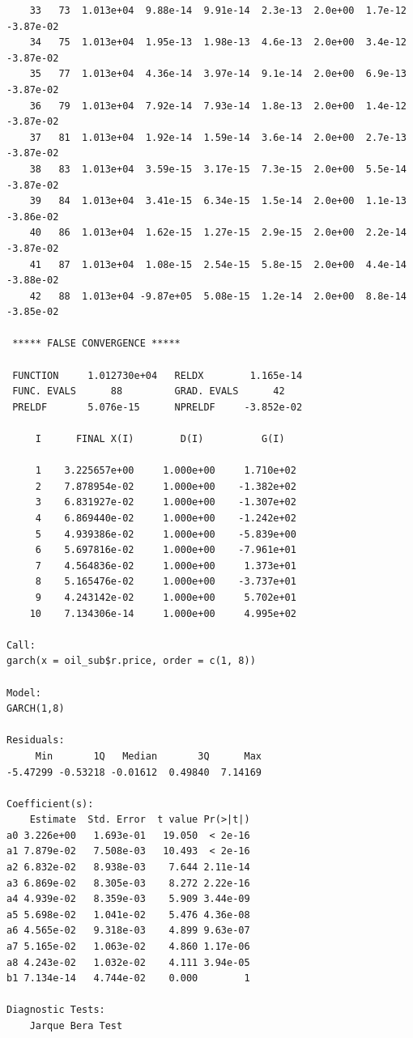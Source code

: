 \documentclass[11pt]{article}\usepackage[]{graphicx}\usepackage[]{color}
\makeatletter
\newenvironment{kframe}{%
 \def\at@end@of@kframe{}%
 \ifinner\ifhmode%
  \def\at@end@of@kframe{\end{minipage}}%
  \begin{minipage}{\columnwidth}%
 \fi\fi%
 \def\FrameCommand##1{\hskip\@totalleftmargin \hskip-\fboxsep
 \colorbox{shadecolor}{##1}\hskip-\fboxsep
     \hskip-\linewidth \hskip-\@totalleftmargin \hskip\columnwidth}%
 \MakeFramed {\advance\hsize-\width
   \@totalleftmargin\z@ \linewidth\hsize
   \@setminipage}}%
 {\par\unskip\endMakeFramed%
 \at@end@of@kframe}
\newenvironment{knitrout}{}{} %
\makeatother
\begin{document}
\begin{knitrout}
\begin{kframe}
\begin{verbatim}
    33   73  1.013e+04  9.88e-14  9.91e-14  2.3e-13  2.0e+00  1.7e-12 -3.87e-02
    34   75  1.013e+04  1.95e-13  1.98e-13  4.6e-13  2.0e+00  3.4e-12 -3.87e-02
    35   77  1.013e+04  4.36e-14  3.97e-14  9.1e-14  2.0e+00  6.9e-13 -3.87e-02
    36   79  1.013e+04  7.92e-14  7.93e-14  1.8e-13  2.0e+00  1.4e-12 -3.87e-02
    37   81  1.013e+04  1.92e-14  1.59e-14  3.6e-14  2.0e+00  2.7e-13 -3.87e-02
    38   83  1.013e+04  3.59e-15  3.17e-15  7.3e-15  2.0e+00  5.5e-14 -3.87e-02
    39   84  1.013e+04  3.41e-15  6.34e-15  1.5e-14  2.0e+00  1.1e-13 -3.86e-02
    40   86  1.013e+04  1.62e-15  1.27e-15  2.9e-15  2.0e+00  2.2e-14 -3.87e-02
    41   87  1.013e+04  1.08e-15  2.54e-15  5.8e-15  2.0e+00  4.4e-14 -3.88e-02
    42   88  1.013e+04 -9.87e+05  5.08e-15  1.2e-14  2.0e+00  8.8e-14 -3.85e-02

 ***** FALSE CONVERGENCE *****

 FUNCTION     1.012730e+04   RELDX        1.165e-14
 FUNC. EVALS      88         GRAD. EVALS      42
 PRELDF       5.076e-15      NPRELDF     -3.852e-02

     I      FINAL X(I)        D(I)          G(I)

     1    3.225657e+00     1.000e+00     1.710e+02
     2    7.878954e-02     1.000e+00    -1.382e+02
     3    6.831927e-02     1.000e+00    -1.307e+02
     4    6.869440e-02     1.000e+00    -1.242e+02
     5    4.939386e-02     1.000e+00    -5.839e+00
     6    5.697816e-02     1.000e+00    -7.961e+01
     7    4.564836e-02     1.000e+00     1.373e+01
     8    5.165476e-02     1.000e+00    -3.737e+01
     9    4.243142e-02     1.000e+00     5.702e+01
    10    7.134306e-14     1.000e+00     4.995e+02

Call:
garch(x = oil_sub$r.price, order = c(1, 8))

Model:
GARCH(1,8)

Residuals:
     Min       1Q   Median       3Q      Max 
-5.47299 -0.53218 -0.01612  0.49840  7.14169 

Coefficient(s):
    Estimate  Std. Error  t value Pr(>|t|)
a0 3.226e+00   1.693e-01   19.050  < 2e-16
a1 7.879e-02   7.508e-03   10.493  < 2e-16
a2 6.832e-02   8.938e-03    7.644 2.11e-14
a3 6.869e-02   8.305e-03    8.272 2.22e-16
a4 4.939e-02   8.359e-03    5.909 3.44e-09
a5 5.698e-02   1.041e-02    5.476 4.36e-08
a6 4.565e-02   9.318e-03    4.899 9.63e-07
a7 5.165e-02   1.063e-02    4.860 1.17e-06
a8 4.243e-02   1.032e-02    4.111 3.94e-05
b1 7.134e-14   4.744e-02    0.000        1

Diagnostic Tests:
	Jarque Bera Test


\end{verbatim}
\end{kframe}
\end{knitrout}
\end{document}
